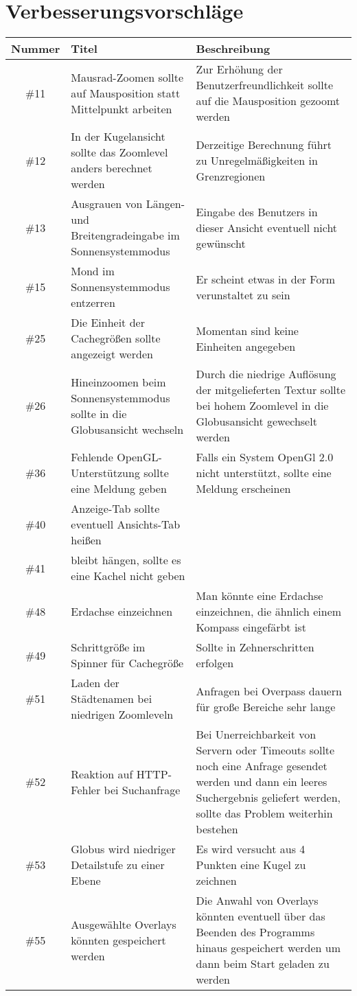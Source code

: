 \documentclass[10pt]{scrreprt}
\newcommand{\JoglEarth}{\raisebox{-1.2mm}{\texttt{[image: Logo-Text.eps]}} }
\begin{document}
\section{Verbesserungsvorschläge}
\begin{longtable}{|c|p{5.2cm}|p{8.2cm}|}
\hline
Nummer & Titel & Beschreibung \\
\hline
\hline
\#11 & Mausrad-Zoomen sollte auf Mausposition statt Mittelpunkt arbeiten & Zur Erhöhung der Benutzerfreundlichkeit sollte auf die Mausposition gezoomt werden \\
\hline
\#12 & In der Kugelansicht sollte das Zoomlevel anders berechnet werden & Derzeitige Berechnung führt zu Unregelmäßigkeiten in Grenzregionen \\
\hline
\#13 & Ausgrauen von Längen- und Breitengradeingabe im Sonnensystemmodus & Eingabe des Benutzers in dieser Ansicht eventuell nicht gewünscht \\
\hline
\#15 & Mond im Sonnensystemmodus entzerren & Er scheint etwas in der Form verunstaltet zu sein \\
\hline
\#25 & Die Einheit der Cachegrößen sollte angezeigt werden & Momentan sind keine Einheiten angegeben \\
\hline
\#26 & Hineinzoomen beim Sonnensystemmodus sollte in die Globusansicht wechseln & Durch die niedrige Auflösung der mitgelieferten Textur sollte bei hohem Zoomlevel in die Globusansicht gewechselt werden \\
\hline
\#36 & Fehlende OpenGL-Unterstützung sollte eine Meldung geben & Falls ein System OpenGl 2.0 nicht unterstützt, sollte eine Meldung erscheinen \\
\hline
\#40 & Anzeige-Tab sollte eventuell Ansichts-Tab heißen & \\
\hline
\#41 & \JoglEarth bleibt hängen, sollte es eine Kachel nicht geben & \\
\hline
\#48 & Erdachse einzeichnen & Man könnte eine Erdachse einzeichnen, die ähnlich einem Kompass eingefärbt ist \\
\hline
\#49 & Schrittgröße im Spinner für Cachegröße &
Sollte in Zehnerschritten erfolgen \\
\hline
\#51 & Laden der Städtenamen bei niedrigen Zoomleveln & Anfragen bei Overpass dauern für große Bereiche sehr lange \\
\hline
\#52 & Reaktion auf HTTP-Fehler bei Suchanfrage & Bei Unerreichbarkeit von Servern oder Timeouts sollte noch eine Anfrage gesendet werden und dann ein leeres Suchergebnis geliefert werden, sollte das Problem weiterhin bestehen \\
\hline
\#53 & Globus wird niedriger Detailstufe zu einer Ebene & Es wird versucht aus 4 Punkten eine Kugel zu zeichnen \\
\hline
\#55 & Ausgewählte Overlays könnten gespeichert werden & Die Anwahl von Overlays könnten eventuell über das Beenden des Programms hinaus gespeichert werden um dann beim Start geladen zu werden \\
\hline
\end{longtable}
\end{document}
